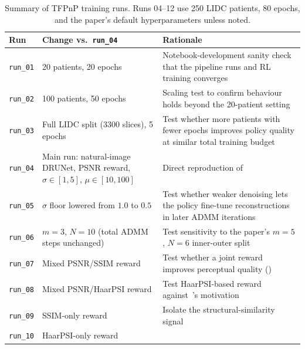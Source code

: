 \begin{table}[H]
    \centering
    \footnotesize
    \caption{Summary of TFPnP training runs. Runs 04--12 use 250 LIDC
    patients, 80 epochs, and the paper's default hyperparameters
    unless noted.}
    \label{tab:run-matrix}
    \begin{tabular}{L{2.2cm}L{5.5cm}L{5.5cm}}
        \toprule
        Run & Change vs.\ \texttt{run\_04} & Rationale \\
        \midrule
        \texttt{run\_01} & 20 patients, 20 epochs
                        & Notebook-development sanity check that the pipeline runs and RL training converges
                        \\ \hline
        \texttt{run\_02} & 100 patients, 50 epochs
                        & Scaling test to confirm behaviour holds beyond the 20-patient setting
                        \\ \hline
        \texttt{run\_03} & Full LIDC split (3300 slices), 5 epochs
                        & Test whether more patients with fewer epochs improves policy quality at similar total training budget
                        \\ \hline
        \texttt{run\_04} & Main run: natural-image DRUNet, PSNR reward, $\sigma \in [1, 5]$, $\mu \in [10, 100]$
                        & Direct reproduction of~\citet{Wei2022TFPnP} \\ \hline
        \texttt{run\_05} & $\sigma$ floor lowered from $1.0$ to $0.5$
                        & Test whether weaker denoising lets the policy fine-tune reconstructions in later ADMM iterations
                        \\ \hline
        \texttt{run\_06} & $m = 3$, $N = 10$ (total ADMM steps unchanged)
                        & Test sensitivity to the paper's $m = 5$, $N = 6$ inner-outer split
                        \\ \hline
        \texttt{run\_07} & Mixed PSNR/SSIM reward
                        & Test whether a joint reward improves perceptual quality ()
                        \\ \hline
        \texttt{run\_08} & Mixed PSNR/HaarPSI reward
                        & Test HaarPSI-based reward against~\citet{breger2025study}'s motivation
                        \\ \hline
        \texttt{run\_09} & SSIM-only reward
                        & Isolate the structural-similarity signal
                        \\ \hline
        \texttt{run\_10} & HaarPSI-only reward

\end{tabular}
\end{table}
